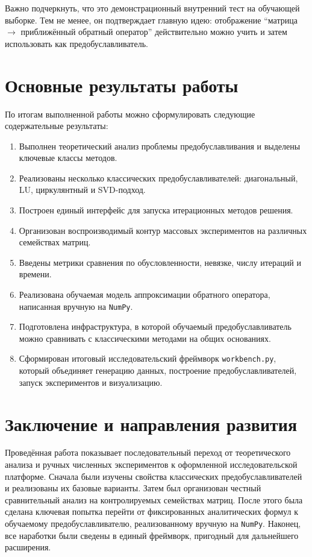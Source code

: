 \documentclass[12pt,a4paper]{article}
\begin{document}
Важно подчеркнуть, что это демонстрационный внутренний тест на обучающей выборке. Тем не менее, он подтверждает главную идею: отображение ``матрица $\rightarrow$ приближённый обратный оператор'' действительно можно учить и затем использовать как предобуславливатель.

\section{Основные результаты работы}

По итогам выполненной работы можно сформулировать следующие содержательные результаты:
\begin{enumerate}[label=\arabic*.]
    \item Выполнен теоретический анализ проблемы предобуславливания и выделены ключевые классы методов.
    \item Реализованы несколько классических предобуславливателей: диагональный, LU, циркулянтный и SVD-подход.
    \item Построен единый интерфейс для запуска итерационных методов решения.
    \item Организован воспроизводимый контур массовых экспериментов на различных семействах матриц.
    \item Введены метрики сравнения по обусловленности, невязке, числу итераций и времени.
    \item Реализована обучаемая модель аппроксимации обратного оператора, написанная вручную на \texttt{NumPy}.
    \item Подготовлена инфраструктура, в которой обучаемый предобуславливатель можно сравнивать с классическими методами на общих основаниях.
    \item Сформирован итоговый исследовательский фреймворк \texttt{workbench.py}, который объединяет генерацию данных, построение предобуславливателей, запуск экспериментов и визуализацию.
\end{enumerate}

\section{Заключение и направления развития}

Проведённая работа показывает последовательный переход от теоретического анализа и ручных численных экспериментов к оформленной исследовательской платформе. Сначала были изучены свойства классических предобуславливателей и реализованы их базовые варианты. Затем был организован честный сравнительный анализ на контролируемых семействах матриц. После этого была сделана ключевая попытка перейти от фиксированных аналитических формул к обучаемому предобуславливателю, реализованному вручную на \texttt{NumPy}. Наконец, все наработки были сведены в единый фреймворк, пригодный для дальнейшего расширения.
\end{document}
